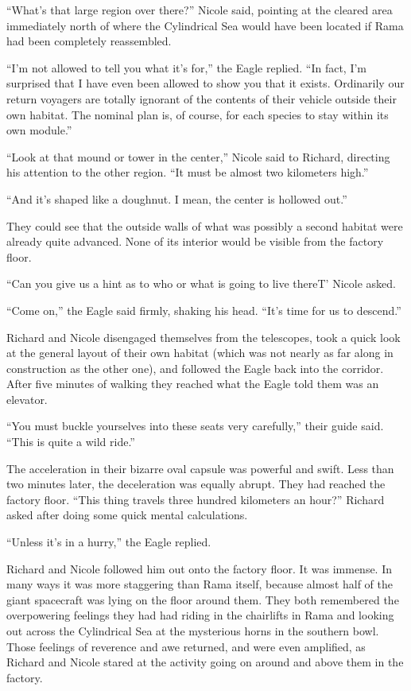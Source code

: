 \documentclass[]{article}
\begin{document}
{“What’s that large region over there?” Nicole said, pointing at the cleared area immediately north of where the Cylindrical Sea would have been located if Rama had been completely reassembled.

“I’m not allowed to tell you what it’s for,” the Eagle replied.  “In fact, I’m surprised that I have even been allowed to show you that it exists.  Ordinarily our return voyagers are totally ignorant of the contents of their vehicle outside their own habitat.  The nominal plan is, of course, for each species to stay within its own module.”

“Look at that mound or tower in the center,” Nicole said to Richard, directing his attention to the other region.  “It must be almost two kilometers high.”

“And it’s shaped like a doughnut.  I mean, the center is hollowed out.”

They could see that the outside walls of what was possibly a second habitat were already quite advanced.  None of its interior would be visible from the factory floor.

“Can you give us a hint as to who or what is going to live thereT’ Nicole asked.

“Come on,” the Eagle said firmly, shaking his head.  “It’s time for us to descend.”

Richard and Nicole disengaged themselves from the telescopes, took a quick look at the general layout of their own habitat (which was not nearly as far along in construction as the other one), and followed the Eagle back into the corridor.  After five minutes of walking they reached what the Eagle told them was an elevator.

“You must buckle yourselves into these seats very carefully,” their guide said.  “This is quite a wild ride.”

The acceleration in their bizarre oval capsule was powerful and swift.  Less than two minutes later, the deceleration was equally abrupt.  They had reached the factory floor.  “This thing travels three hundred kilometers an hour?” Richard asked after doing some quick mental calculations.

“Unless it’s in a hurry,” the Eagle replied.

Richard and Nicole followed him out onto the factory floor.  It was immense.  In many ways it was more staggering than Rama itself, because almost half of the giant spacecraft was lying on the floor around them.  They both remembered the overpowering feelings they had had riding in the chairlifts in Rama and looking out across the Cylindrical Sea at the mysterious horns in the southern bowl.  Those feelings of reverence and awe returned, and were even amplified, as Richard and Nicole stared at the activity going on around and above them in the factory.

}
\end{document}
